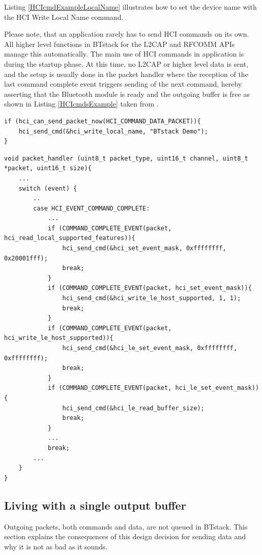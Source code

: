 \documentclass[a4paper,titlepage,oneside,12pt]{amsart} %
\begin{document}
Listing \ref{HCIcmdExampleLocalName} illustrates how to set the device name with the HCI Write Local Name command.

Please note, that an application rarely has to send HCI commands on its own. All higher level functions in BTstack for the L2CAP and RFCOMM APIs manage this automatically. The main use of HCI commands in application is during the startup phase. At this time, no L2CAP or higher level data is sent, and the setup is usually done in the packet handler where the reception of the last  command complete event triggers sending of the next command, hereby asserting that the Bluetooth module is ready and the outgoing buffer is free as shown in Listing \ref{HCIcmdsExample} taken from .

\begin{lstlisting}[caption= Send hci\_write\_local\_name command that takes a string as a parameter., label=HCIcmdExampleLocalName]
if (hci_can_send_packet_now(HCI_COMMAND_DATA_PACKET)){
    hci_send_cmd(&hci_write_local_name, "BTstack Demo");
}  
\end{lstlisting}

\noindent\begin{minipage}{\textwidth}
\begin{lstlisting}[caption=Example of sending a sequence of HCI Commands,label=HCIcmdsExample]
void packet_handler (uint8_t packet_type, uint16_t channel, uint8_t *packet, uint16_t size){
    ...
    switch (event) {
        .. 
        case HCI_EVENT_COMMAND_COMPLETE:
            ...
            if (COMMAND_COMPLETE_EVENT(packet, hci_read_local_supported_features)){
                hci_send_cmd(&hci_set_event_mask, 0xffffffff, 0x20001fff);
                break;
            }
            if (COMMAND_COMPLETE_EVENT(packet, hci_set_event_mask)){
                hci_send_cmd(&hci_write_le_host_supported, 1, 1);
                break;
            }
            if (COMMAND_COMPLETE_EVENT(packet, hci_write_le_host_supported)){
                hci_send_cmd(&hci_le_set_event_mask, 0xffffffff, 0xffffffff);
                break;
            }
            if (COMMAND_COMPLETE_EVENT(packet, hci_le_set_event_mask)){
                hci_send_cmd(&hci_le_read_buffer_size);
                break;
            }
            ...
            break;
        ...
    }
}
\end{lstlisting}
\end{minipage}

\subsection{Living with a single output buffer}
\label{section:single_buffer}
Outgoing packets, both commands and data, are not queued in BTstack. This section explains the consequences of this design decision for sending data and why it is not as bad as it sounds.
\end{document}
